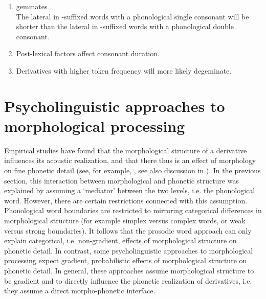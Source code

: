 \begin{enumerate}
	

	
	\item  {} geminates \\
	The lateral in -suffixed words with a phonological single consonant will be shorter than the lateral in -suffixed words with a phonological double consonant. 
	
	\item Post-lexical factors affect consonant duration.
	
		\item Derivatives with higher token frequency will more likely degeminate.
	
\end{enumerate}






\section{Psycholinguistic approaches to morphological processing} \label{Morphological Gemination: Implications for Psycholinguistic Theories of Morphological Processing}

Empirical studies have found that the morphological structure of a derivative influences its acoustic realization, and that there thus is an effect of morphology on fine phonetic detail (see, for example, \citealt{Sproat.1993b, Cho.2001, Sugahara.2009, Pluymaekers.2010, Smith.2012, LeeKim.2013, Plag.2017}, see also discussion in ). 
In the previous section, this interaction between morphological and phonetic structure was explained by assuming a `mediator' between the two levels, i.e. the phonological word. However, there are certain restrictions connected with this assumption. Phonological word boundaries are restricted to mirroring categorical differences in morphological structure (for example simplex versus complex words, or weak versus strong boundaries). It follows that the prosodic word approach can only explain categorical, i.e. non-gradient, effects of morphological structure on phonetic detail. 
In contrast, some psycholinguistic approaches to morphological processing expect gradient, probabilistic effects of morphological structure on phonetic detail. In general, these approaches assume morphological structure to be gradient and to directly influence the phonetic realization of derivatives, i.e. they assume a direct morpho-phonetic interface. 


